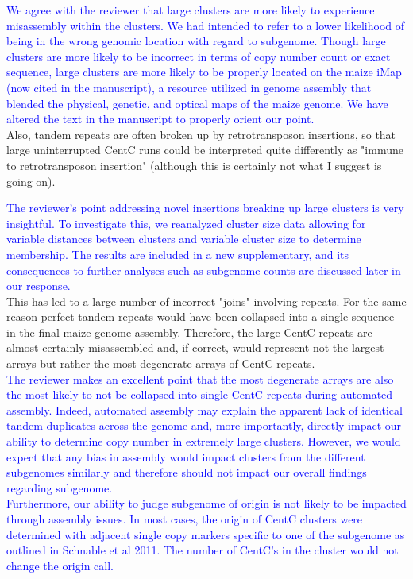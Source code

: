 \documentclass[]{article}
\newcommand{\res}[1]{\noindent \textcolor{blue}{{#1}} \\}
\begin{document}
\res{We agree with the reviewer that large clusters are more likely to experience misassembly within the clusters.  
We had intended to refer to a lower likelihood of being in the wrong genomic location with regard to subgenome.  
Though large clusters are more likely to be incorrect in terms of copy number count or exact sequence, large clusters are more likely to be properly located on the maize iMap (now cited in the manuscript), a resource utilized in genome assembly that blended the physical, genetic, and optical maps of the maize genome.  
We have altered the text in the manuscript to properly orient our point.}

Also, tandem repeats are often broken up by retrotransposon insertions, so that large uninterrupted CentC runs could be interpreted quite differently as "immune to retrotransposon insertion" (although this is certainly not what I suggest is going on).

\res{The reviewer's point addressing novel insertions breaking up large clusters is very insightful.
To investigate this, we reanalyzed cluster size data allowing for variable distances between clusters and variable cluster size to determine membership.
The results are included in a new supplementary, and its consequences to further analyses such as subgenome counts are discussed later in our response.}

This has led to a large number of incorrect "joins" involving repeats.  
For the same reason perfect tandem repeats would have been collapsed into a single sequence in the final maize genome assembly.  
Therefore, the large CentC repeats are almost certainly misassembled and, if correct, would represent not the largest arrays but rather the most degenerate arrays of CentC repeats.\\

\res{The reviewer makes an excellent point that the most degenerate arrays are also the most likely to not be collapsed into single CentC repeats during automated assembly.
Indeed, automated assembly may explain the apparent lack of identical tandem duplicates across the genome and, more importantly, directly impact our ability to determine copy number in extremely large clusters.  
However, we would expect that any bias in assembly would impact clusters from the different subgenomes similarly and therefore should not impact our overall findings regarding subgenome.  }

\res{Furthermore, our ability to judge subgenome of origin is not likely to be impacted through assembly issues. In most cases, the origin of CentC clusters were determined with adjacent single copy markers specific to one of the subgenome as outlined in Schnable et al 2011.  The number of CentC's in the cluster would not change the origin call.}
\end{document}
